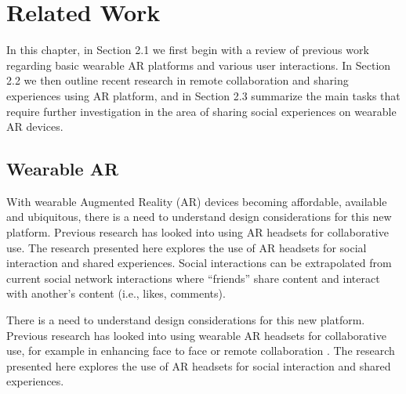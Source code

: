 \chapter{Related Work} %

\label{ch:background} %

In this chapter, in Section 2.1 we first begin with a review of previous work regarding basic wearable AR platforms and various user interactions. In Section 2.2 we then outline recent research in remote collaboration and sharing experiences using AR platform, and in Section 2.3 summarize the main tasks that require further investigation in the area of sharing social experiences on wearable AR devices.

\section{Wearable AR}

With wearable Augmented Reality (AR) devices becoming affordable, available and ubiquitous, there is a need to understand design considerations for this new platform. Previous research has looked into using AR headsets for collaborative use. The research presented here explores the use of AR headsets for social interaction and shared experiences. Social interactions can be extrapolated from current social network interactions where \enquote{friends} share content and interact with another's content (i.e., likes, comments).

There is a need to understand design considerations for this new platform. Previous research has looked into using wearable AR headsets for collaborative use, for example in enhancing face to face \cite{Billinghurst2002} or remote collaboration \cite{gupta2016you}. The research presented here explores the use of AR headsets for social interaction and shared experiences. 



